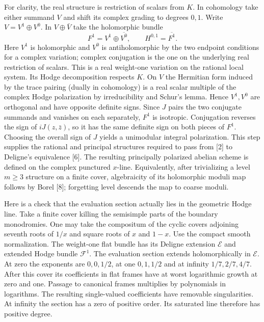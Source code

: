 \documentclass[10pt]{article}
\begin{document}
For clarity, the real structure is restriction of scalars from $K$. In cohomology take either summand $V$ and shift its complex grading to degrees $0,1$. Write $V=V^1\oplus V^0$. In $V\oplus\bar V$ take the holomorphic bundle
\[
 F^1=V^1\oplus\overline{V^0},\qquad H^{0,1}=\overline{F^1}.
\]
Here $V^1$ is holomorphic and $V^0$ is antiholomorphic by the two endpoint conditions for a complex variation; complex conjugation is the one on the underlying real restriction of scalars. This is a real weight-one variation on the rational local system. Its Hodge decomposition respects $K$. On $V$ the Hermitian form induced by the trace pairing (dually in cohomology) is a real scalar multiple of the complex Hodge polarization by irreducibility and Schur's lemma. Hence $V^1,V^0$ are orthogonal and have opposite definite signs. Since $J$ pairs the two conjugate summands and vanishes on each separately, $F^1$ is isotropic. Conjugation reverses the sign of $iJ(z,\bar z)$, so it has the same definite sign on both pieces of $F^1$. Choosing the overall sign of $J$ yields a unimodular integral polarization. This step supplies the rational and principal structures required to pass from [2] to Deligne's equivalence [6]. The resulting principally polarized abelian scheme is defined on the complex punctured $x$-line. Equivalently, after trivializing a level $m\ge3$ structure on a finite cover, algebraicity of its holomorphic moduli map follows by Borel [8]; forgetting level descends the map to coarse moduli.

Here is a check that the evaluation section actually lies in the geometric Hodge line. Take a finite cover killing the semisimple parts of the boundary monodromies. One may take the compositum of the cyclic covers adjoining seventh roots of $1/x$ and square roots of $x$ and $1-x$. Use the compact smooth normalization. The weight-one flat bundle has its Deligne extension $\mathcal E$ and extended Hodge bundle $\mathcal F^1$. The evaluation section extends holomorphically in $\mathcal E$. At zero the exponents are $0,0,1/2$, at one $0,1,1/2$ and at infinity $1/7,2/7,4/7$. After this cover its coefficients in flat frames have at worst logarithmic growth at zero and one. Passage to canonical frames multiplies by polynomials in logarithms. The resulting single-valued coefficients have removable singularities. At infinity the section has a zero of positive order. Its saturated line therefore has positive degree.
\end{document}
